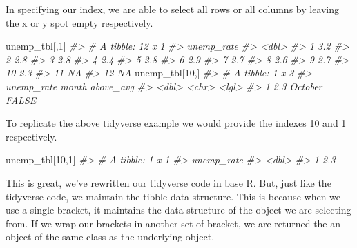 \documentclass[
]{book}
\newenvironment{Shaded}{\begin{snugshade}}{\end{snugshade}}
\newcommand{\CommentTok}[1]{\textcolor[rgb]{0.56,0.35,0.01}{\textit{#1}}}
\newcommand{\DecValTok}[1]{\textcolor[rgb]{0.00,0.00,0.81}{#1}}
\newcommand{\NormalTok}[1]{#1}
\begin{document}
In specifying our index, we are able to select all rows or all columns by leaving the x or y spot empty respectively.

\begin{Shaded}
\begin{Highlighting}[]
\NormalTok{unemp\_tbl[,}\DecValTok{1}\NormalTok{]}
\CommentTok{\#\textgreater{} \# A tibble: 12 x 1}
\CommentTok{\#\textgreater{}    unemp\_rate}
\CommentTok{\#\textgreater{}         \textless{}dbl\textgreater{}}
\CommentTok{\#\textgreater{}  1        3.2}
\CommentTok{\#\textgreater{}  2        2.8}
\CommentTok{\#\textgreater{}  3        2.8}
\CommentTok{\#\textgreater{}  4        2.4}
\CommentTok{\#\textgreater{}  5        2.8}
\CommentTok{\#\textgreater{}  6        2.9}
\CommentTok{\#\textgreater{}  7        2.7}
\CommentTok{\#\textgreater{}  8        2.6}
\CommentTok{\#\textgreater{}  9        2.7}
\CommentTok{\#\textgreater{} 10        2.3}
\CommentTok{\#\textgreater{} 11       NA  }
\CommentTok{\#\textgreater{} 12       NA}
\NormalTok{unemp\_tbl[}\DecValTok{10}\NormalTok{,]}
\CommentTok{\#\textgreater{} \# A tibble: 1 x 3}
\CommentTok{\#\textgreater{}   unemp\_rate month   above\_avg}
\CommentTok{\#\textgreater{}        \textless{}dbl\textgreater{} \textless{}chr\textgreater{}   \textless{}lgl\textgreater{}    }
\CommentTok{\#\textgreater{} 1        2.3 October FALSE}
\end{Highlighting}
\end{Shaded}

To replicate the above tidyverse example we would provide the indexes 10 and 1 respectively.

\begin{Shaded}
\begin{Highlighting}[]
\NormalTok{unemp\_tbl[}\DecValTok{10}\NormalTok{,}\DecValTok{1}\NormalTok{]}
\CommentTok{\#\textgreater{} \# A tibble: 1 x 1}
\CommentTok{\#\textgreater{}   unemp\_rate}
\CommentTok{\#\textgreater{}        \textless{}dbl\textgreater{}}
\CommentTok{\#\textgreater{} 1        2.3}
\end{Highlighting}
\end{Shaded}

This is great, we've rewritten our tidyverse code in base R. But, just like the tidyverse code, we maintain the tibble data structure. This is because when we use a single bracket, it maintains the data structure of the object we are selecting from. If we wrap our brackets in another set of bracket, we are returned the an object of the same class as the underlying object.
\end{document}
